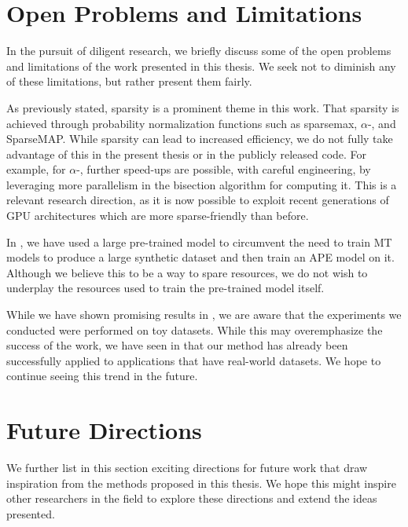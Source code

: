 \section{Open Problems and Limitations}

In the pursuit of diligent research, we briefly discuss some of the
open problems and limitations of the work presented in this thesis.
We seek not to diminish any of these limitations, but rather present
them fairly.
%

As previously stated, sparsity is a prominent theme in this work.
That sparsity is achieved through probability normalization functions
such as sparsemax, $\alpha$-\entmaxtext, and SparseMAP. While
sparsity can lead to increased efficiency, we do not fully take
advantage of this in the present thesis or in the publicly released
code. For example, for $\alpha$-\entmaxtext, further speed-ups are
possible, with careful engineering, by leveraging more parallelism in
the bisection algorithm for computing it.
This is a relevant research direction, as it is now possible to
exploit recent generations of GPU architectures which are more
sparse-friendly than before.

In , we have used a large pre-trained model to
circumvent the need to train MT models to produce a large synthetic
dataset and then train an APE model on it. Although we believe
this to be a way to spare resources, we do not wish to underplay
the resources used to train the pre-trained model itself.

While we have shown promising results in ,
we are aware that the experiments we conducted were performed on toy
datasets. While this may overemphasize the success of the work, we
have seen in  that our method has already been
successfully applied to applications that have real-world datasets.
We hope to continue seeing this trend in the future.

\section{Future Directions}

We further list in this section exciting directions for future work
that draw inspiration from the methods proposed in this thesis. We
hope this might inspire other researchers in the field to explore
these directions and extend the ideas presented.

